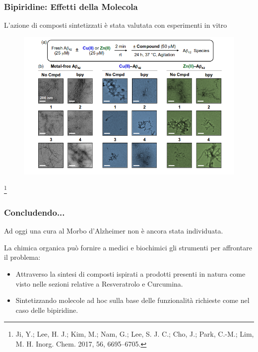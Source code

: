 \documentclass[9pt]{beamer}
\newcommand\blfootnote[1]{%
	\begingroup
	\renewcommand\thefootnote{}\footnote{#1}%
	\addtocounter{footnote}{-1}%
	\endgroup
}
\begin{document}
\begin{frame}
	\frametitle{Bipiridine: Effetti della Molecola}
	L'azione di composti sintetizzati è stata valutata con esperimenti in vitro
	
	\begin{figure}
		\includegraphics[scale=1.5]{immagini/ris_bpy2.png}
	\end{figure}
	\blfootnote{Ji, Y.; Lee, H. J.; Kim, M.; Nam, G.; Lee, S. J. C.; Cho, J.; Park, C.-M.; Lim, M. H. Inorg. Chem. 2017,
		56, 6695–6705.}
\end{frame}

\begin{frame}
	\frametitle{Concludendo...}
	Ad oggi una cura al Morbo d'Alzheimer non è ancora stata individuata.
	
	La chimica organica può fornire a medici e biochimici gli strumenti per affrontare il problema:
	\begin{itemize}

		\item Attraverso la sintesi di composti ispirati a prodotti 	presenti in natura come visto nelle sezioni relative a Resveratrolo e Curcumina.
		\item Sintetizzando molecole ad hoc sulla base delle funzionalità richieste come nel caso delle bipiridine.
		      
	\end{itemize}
\end{frame}
\end{document}
